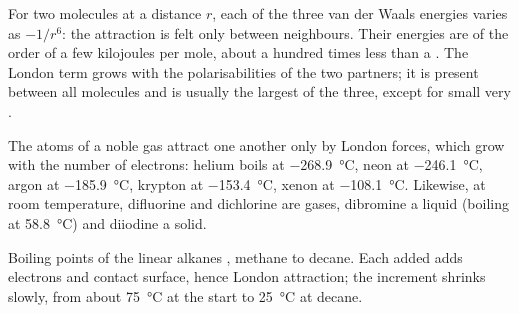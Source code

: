 \begin{proposition}\label{prop:b1:intermolecular-forces-solvents:distance-law}
For two molecules at a distance $r$, each of the three van der Waals
energies varies as $-1/r^6$: the attraction is felt only between
neighbours. Their energies are of the order of a few kilojoules per
mole, about a hundred times less than a . The London term
grows with the polarisabilities of the two partners; it is present
between all molecules and is usually the largest of the three, except
for small very .
\end{proposition}
\admitted

\begin{example}\label{ex:b1:intermolecular-forces-solvents:noble}
The atoms of a noble gas attract one another only by London forces,
which grow with the number of electrons: helium boils at
\qty{-268.9}{\celsius}, neon at \qty{-246.1}{\celsius}, argon at
\qty{-185.9}{\celsius}, krypton at \qty{-153.4}{\celsius}, xenon at
\qty{-108.1}{\celsius}. Likewise, at room temperature, difluorine and
dichlorine are gases, dibromine a liquid (boiling at \qty{58.8}{\celsius})
and diiodine a solid.
\end{example}

\begin{omfigure}

{\small Boiling points of the linear alkanes , methane to
decane. Each added  adds electrons and contact surface, hence
London attraction; the increment shrinks slowly, from about
\qty{75}{\celsius} at the start to \qty{25}{\celsius} at decane.}
\end{omfigure}

